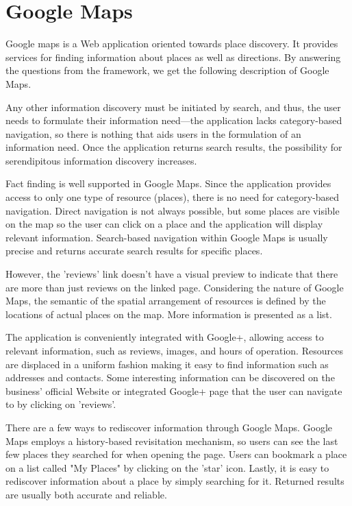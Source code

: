 {\section{Google Maps}
Google maps is a Web application oriented towards place discovery. It provides services for finding information about places as well as directions.  By answering the questions from the framework, we get the following description of Google Maps.

  Any other information discovery must be initiated by search, and thus, the user needs to formulate their information need---the application lacks category-based navigation, so there is nothing that aids users in the formulation of an information need. Once the application returns search results, the possibility for serendipitous information discovery increases.  

Fact finding is well supported in Google Maps. Since the application provides access to only one type of resource (places), there is no need for category-based navigation. Direct navigation is not always possible, but some places are visible on the map so the user can click on a place and the application will display relevant information. Search-based navigation within Google Maps is usually precise and returns accurate search results for specific places. 

However, the 'reviews' link doesn't have a visual preview to indicate that there are more than just reviews on the linked page. Considering the nature of Google Maps, the semantic of the spatial arrangement of resources is defined by the locations of actual places on the map. More information is presented as a list. 

The application is conveniently integrated with Google+, allowing access to relevant information, such as reviews, images, and hours of operation. Resources are displaced in a uniform fashion making it easy to find information such as addresses and contacts. Some interesting information can be discovered on the business' official Website or integrated Google+ page that the user can navigate to by clicking on 'reviews'.

There are a few ways to rediscover information through Google Maps. Google Maps employs a history-based revisitation mechanism, so users can see the last few places they searched for when opening the page. Users can bookmark a place on a list called "My Places" by clicking on the 'star' icon. Lastly, it is easy to rediscover information about a place by simply searching for it. Returned results are usually both accurate and reliable.

}
